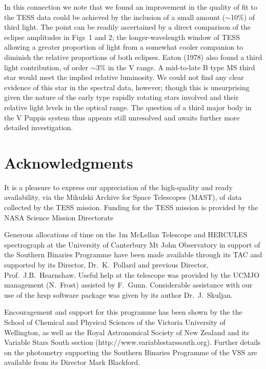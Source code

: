 \documentclass[useAMS,usenatbib]{mnras}                                                                           \usepackage[pdftex]{graphicx}
\begin{document}
In this connection we note that we found an improvement in the quality of 
fit to the TESS data could be achieved by the inclusion of a small
amount ($\sim$10\%) of third light. The point can be readily ascertained
by a direct comparison of the eclipse amplitudes in Figs~1 and 2;
the longer-wavelength window of TESS allowing a greater proportion
of light from a somewhat cooler companion to diminish the relative proportions
of both eclipses. Eaton (1978) also found a third light contribution,
of order $\sim$3\% in the V range. 
 A mid-to-late B type MS third star would meet the implied relative
 luminosity.  We could not find any clear evidence of this star
 in the spectral data, however; though this is unsurprising
 given the nature of the early type rapidly rotating stars involved and
 their relative light levels in the optical range.  The question of a third major body in
the V Puppis system thus appears still unresolved and 
awaits further more detailed investigation.   


\section{Acknowledgments}
 
It is  a pleasure to express our appreciation of the high-quality and 
ready availability, via the Mikulski Archive for Space Telescopes (MAST),
of data collected by the TESS mission.
 Funding for the TESS mission is provided by the NASA Science Mission Directorate
 
Generous allocations of time on the 1m McLellan Telescope and HERCULES spectrograph at the University of Canterbury Mt John Observatory in support of the
Southern Binaries Programme have been made available through its TAC and supported by its  Director, Dr.\ K.\ Pollard and previous Director, Prof.\ J.B.\ Hearnshaw.  Useful help at the telescope was provided by the UCMJO management (N.\ Frost)
assisted by F.\ Gunn.   Considerable assistance with our use of the {\sc hrsp} software 
package was given by its author Dr.\ J.\ Skuljan. 

Encouragement and support for this programme has been shown by the 
the School of Chemical and Physical Sciences
of the Victoria University of Wellington, as well as the Royal Astronomical
Society of New Zealand and its Variable Stars South section
(http://www.variablestarssouth.org). 
Further details on the photometry supporting the Southern Binaries Programme
of the VSS are available from its Director Mark Blackford. 
\end{document}
